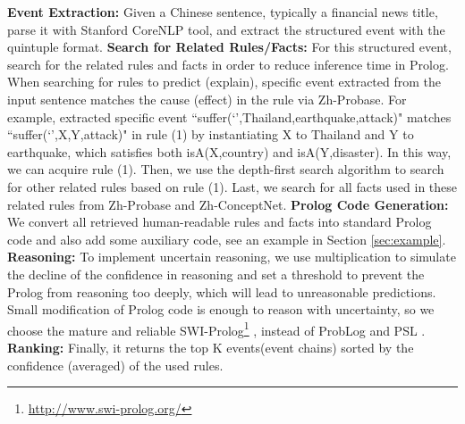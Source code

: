 \textbf{Event Extraction:} Given a Chinese sentence, typically a financial news title, parse it with Stanford CoreNLP tool\cite{Manning}, and extract the structured event with the quintuple format. 
\textbf{Search for Related Rules/Facts:} For this structured event, search for the related rules and facts in order to reduce inference time in Prolog. When searching for rules to predict (explain), specific event extracted from the input sentence matches the cause (effect) in the rule via Zh-Probase. For example, extracted specific event ``suffer(`',Thailand,earthquake,attack)" matches ``suffer(`',X,Y,attack)" in rule (1) by instantiating X to Thailand and Y to earthquake, which satisfies both isA(X,country) and isA(Y,disaster). In this way, we can acquire rule (1). Then, we use the depth-first search algorithm to search for other related rules based on rule (1). Last, we search for all facts used in these related rules from Zh-Probase and Zh-ConceptNet.
\textbf{Prolog Code Generation:}
We convert all retrieved human-readable rules and facts into standard Prolog code and also add some auxiliary code, see an example in Section \ref{sec:example}.
\textbf{Reasoning:}
To implement uncertain reasoning, we use multiplication to simulate the decline of the confidence in reasoning and set a threshold to prevent the Prolog from reasoning too deeply, which will lead to unreasonable predictions. Small modification of Prolog code 
is enough to reason with uncertainty, so we choose the mature and reliable SWI-Prolog\footnote{\url{http://www.swi-prolog.org/}} \cite{Wielemaker2010}, instead of ProbLog \cite{de2007problog} and PSL \cite{bach:jmlr17}.
\textbf{Ranking:}
Finally, it returns the top K events(event chains) sorted by the confidence (averaged) of the used rules.